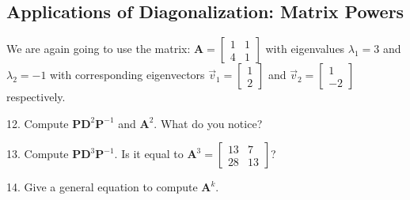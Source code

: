 \documentclass{article}
\begin{document}
\begin{flushleft}
%
%
%
%

\section*{Applications of Diagonalization: Matrix Powers}
We are again going to use the matrix: $\textbf{A} = \begin{bmatrix} 1 & 1 \\ 4 & 1 \end{bmatrix}$ \hspace{0.2in} with eigenvalues $\lambda_1 = 3$ and $\lambda_2 = -1$ with corresponding eigenvectors $\vec{v}_1 = \begin{bmatrix} 1 \\ 2 \end{bmatrix}$ and $\vec{v}_2 = \begin{bmatrix} 1 \\ -2 \end{bmatrix}$ respectively.

\vspace{0.1in}

12. Compute $\textbf{PD}^2 \textbf{P}^{-1}$ and $\textbf{A}^2 $. What do you notice?

\vspace{2.5in}

13. Compute $\textbf{PD}^3 \textbf{P}^{-1}$. Is it equal to $\textbf{A}^3 = \begin{bmatrix} 13 & 7 \\ 28 & 13 \end{bmatrix}$?

\vspace{2in}

14. Give a general equation to compute $\textbf{A}^k$.

\vspace{1in}


\end{flushleft}
\end{document}
